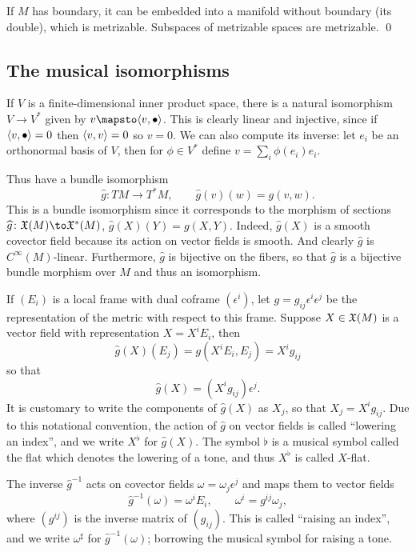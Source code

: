     If $M$ has boundary, it can be embedded into a manifold without boundary (its double), which is metrizable.
    Subspaces of metrizable spaces are metrizable.
    \qed

\eproof

\subsection{The musical isomorphisms}

If $V$ is a finite-dimensional inner product space, there is a natural isomorphism $V\to V^*$ given by $v\mapsto\iprod{v,\bul}$.
This is clearly linear and injective, since if $\mathopen{}\mathclose{\left<v,\bullet\right>}=0$ then $\mathopen{}\mathclose{\left<v,v\right>}=0$ so $v=0$.
We can also compute its inverse: let $e_i$ be an orthonormal basis of $V$, then for $\phi\in V^*$ define $v=\sum_i\phi(e_i)e_i$.

Thus have a bundle isomorphism
$$ \hat g\colon TM\to T^*M,\qquad \hat g(v)(w) = g(v,w) . $$
This is a bundle isomorphism since it corresponds to the morphism of sections $\hat g\colon\X(M)\to\X^*(M)$, $\hat g(X)(Y)=g(X,Y)$.
Indeed, $\hat g(X)$ is a smooth covector field because its action on vector fields is smooth.
And clearly $\hat g$ is $C^\infty(M)$-linear.
Furthermore, $\hat g$ is bijective on the fibers, so that $\hat g$ is a bijective bundle morphism over $M$ and thus an isomorphism.

If $(E_i)$ is a local frame with dual coframe $(\epsilon^i)$, let $g=g_{ij}\epsilon^i\epsilon^j$ be the representation of the metric with respect to this frame.
Suppose $X\in{\frak X}(M)$ is a vector field with representation $X=X^iE_i$, then
$$ \hat g(X)(E_j) = g(X^iE_i,E_j) = X^ig_{ij} $$
so that
$$ \hat g(X) = (X^ig_{ij})\epsilon^j . $$
It is customary to write the components of $\hat g(X)$ as $X_j$, so that $X_j=X^ig_{ij}$.
Due to this notational convention, the action of $\hat g$ on vector fields is called ``lowering an index'', and we write $X^\flat$ for $\hat g(X)$.
The symbol $\flat$ is a musical symbol called the {\emphcolor flat} which denotes the lowering of a tone, and thus $X^\flat$ is called $X$-flat.

The inverse $\hat g^{-1}$ acts on covector fields $\omega=\omega_j\epsilon^j$ and maps them to vector fields
$$ \hat g^{-1}(\omega) = \omega^iE_i,\qquad \omega^i = g^{ij}\omega_j , $$
where $(g^{ij})$ is the inverse matrix of $(g_{ij})$.
This is called ``raising an index'', and we write $\omega^\sharp$ for $\hat g^{-1}(\omega)$; borrowing the musical symbol for raising a tone.

